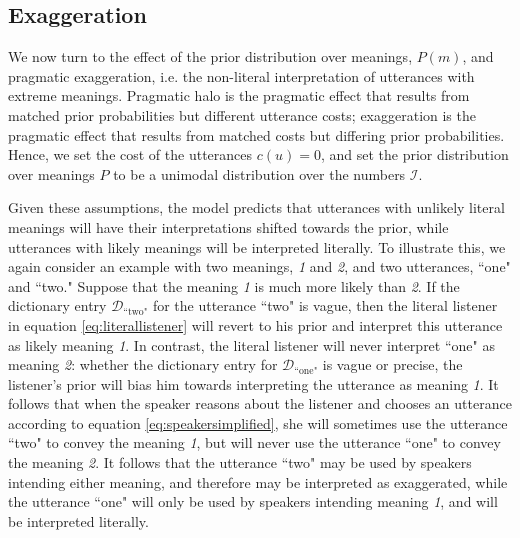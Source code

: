 \documentclass{article} %
\newcommand{\dictionary}{\ensuremath{\mathcal{D}}\xspace}
\begin{document}
\subsection{Exaggeration}

We now turn to the effect of the prior distribution over meanings, $P(m)$, and pragmatic exaggeration, i.e. the non-literal interpretation of utterances with extreme meanings. 
Pragmatic halo is the pragmatic effect that results from matched prior probabilities but different utterance costs; exaggeration is the pragmatic effect that results from matched costs but differing prior probabilities. 
Hence, we set the cost of the utterances $c(u)=0$, and set the prior distribution over meanings $P$ to be a unimodal distribution over the numbers $\mathcal I$. 

Given these assumptions, the model predicts that utterances with unlikely literal meanings will have their interpretations shifted towards the prior, while utterances with likely meanings will be interpreted literally. To illustrate this, we again consider an example with two meanings, \emph{1} and \emph{2}, and two utterances, ``one" and ``two." Suppose that the meaning \emph{1} is much more likely than \emph{2}. If the dictionary entry $\dictionary_{\text{``two"}}$ for the utterance ``two" is vague, then the literal listener in equation \ref{eq:literallistener} will revert to his prior and interpret this utterance as likely meaning \emph{1}. In contrast, the literal listener will never interpret ``one" as meaning \emph{2}: whether the dictionary entry for $\dictionary_{\text{``one"}}$ is vague or precise, the listener's prior will bias him towards interpreting the utterance as meaning \emph{1}. It follows that when the speaker reasons about the listener and chooses an utterance according to equation \ref{eq:speakersimplified}, she will sometimes use the utterance ``two" to convey the meaning \emph{1}, but will never use the utterance ``one" to convey the meaning \emph{2}. It follows that the utterance ``two" may be used by speakers intending either meaning, and therefore may be interpreted as exaggerated, while the utterance ``one" will only be used by speakers intending meaning \emph{1}, and will be interpreted literally.
\end{document}
